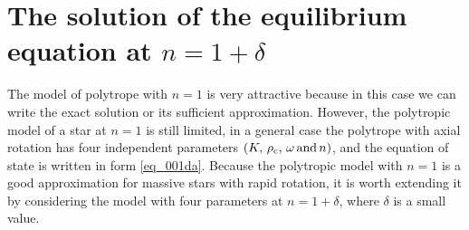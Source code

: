 \documentclass{caosp308}
\begin{document}

\section{The solution of the equilibrium equation at $n=1+\delta$}
\label{sect_06da}

The model of polytrope with $n=1$ is very attractive because in this case we can write the exact solution or its sufficient approximation. However, the polytropic model of a star at $n=1$ is still limited, in a general case the polytrope with axial rotation has four independent parameters $(K,\,\rho_{\rm c},\,\omega\,\text{and}\, n)$, and the equation of state is written in form \eqref{eq_001da}. Because the polytropic model with $n=1$ is a good approximation for massive stars with rapid rotation, it is worth extending it by considering the model with four parameters at $n=1+\delta$, where $\delta$ is a small value.
\end{document}
